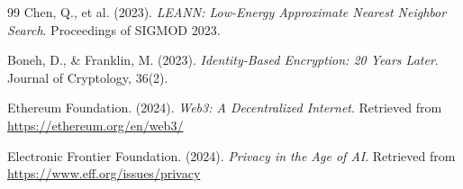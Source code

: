 \documentclass[12pt, a4paper]{article}
\begin{document}
\begin{thebibliography}{99}
Chen, Q., et al. (2023). \textit{LEANN: Low-Energy Approximate Nearest Neighbor Search}. Proceedings of SIGMOD 2023.

Boneh, D., \& Franklin, M. (2023). \textit{Identity-Based Encryption: 20 Years Later}. Journal of Cryptology, 36(2).

Ethereum Foundation. (2024). \textit{Web3: A Decentralized Internet}. Retrieved from \url{https://ethereum.org/en/web3/}

Electronic Frontier Foundation. (2024). \textit{Privacy in the Age of AI}. Retrieved from \url{https://www.eff.org/issues/privacy}

\end{thebibliography}
\end{document}
